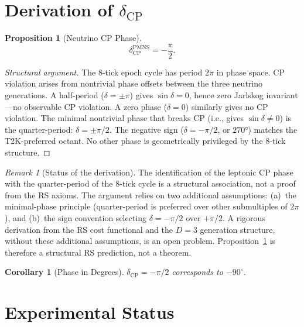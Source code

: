 \documentclass[12pt,a4paper]{article}
\newtheorem{corollary}[theorem]{Corollary}
\newtheorem{proposition}[theorem]{Proposition}
\theoremstyle{definition}
\theoremstyle{remark}
\newtheorem{remark}[theorem]{Remark}
\begin{document}
\section{Derivation of $\delta_{\mathrm{CP}}$}
\label{sec:derivation}

\begin{proposition}[Neutrino CP Phase]
\label{thm:dcp}
\begin{equation}
  \boxed{\delta_{\mathrm{CP}}^{\mathrm{PMNS}} = -\frac{\pi}{2}.}
\end{equation}
\end{proposition}

\begin{proof}[Structural argument]
The 8-tick epoch cycle has period $2\pi$ in phase space.  CP
violation arises from nontrivial phase offsets between the three
neutrino generations.  A half-period ($\delta = \pm\pi$) gives
$\sin\delta = 0$, hence zero Jarlskog invariant---no observable
CP violation.  A zero phase ($\delta = 0$) similarly gives no
CP violation.  The minimal nontrivial phase that breaks CP (i.e.,
gives $\sin\delta \neq 0$) is the quarter-period: $\delta = \pm\pi/2$.
The negative sign ($\delta = -\pi/2$, or $270°$) matches the
T2K-preferred octant.  No other phase is geometrically privileged
by the 8-tick structure.
\end{proof}

\begin{remark}[Status of the derivation]
The identification of the leptonic CP phase with the quarter-period
of the 8-tick cycle is a structural association, not a proof from
the RS axioms.  The argument relies on two additional assumptions:
(a)~the minimal-phase principle (quarter-period is preferred over
other submultiples of $2\pi$), and (b)~the sign convention
selecting $\delta = -\pi/2$ over $+\pi/2$.  A rigorous derivation
from the RS cost functional and the $D=3$ generation structure,
without these additional assumptions, is an open problem.
Proposition~\ref{thm:dcp} is therefore a structural RS prediction,
not a theorem.
\end{remark}

\begin{corollary}[Phase in Degrees]
\label{cor:degrees}
$\delta_{\mathrm{CP}} = -\pi/2$ corresponds to $-90^\circ$.
\end{corollary}

\section{Experimental Status}
\label{sec:experiment}
\end{document}
